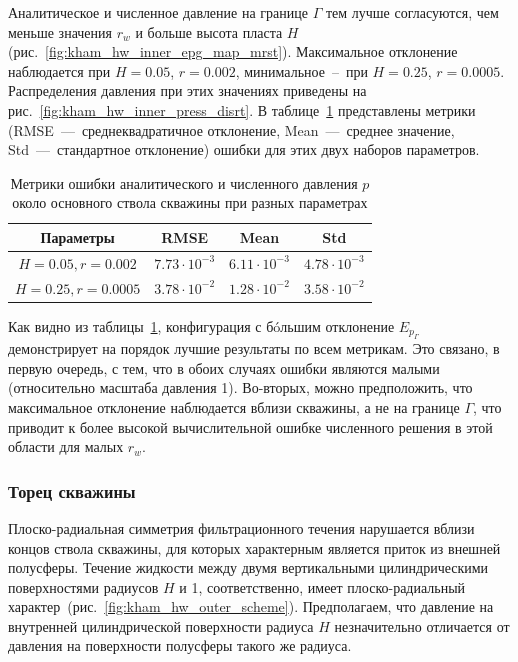 \documentclass{article}
\begin{document}
Аналитическое и численное давление на границе $\Gamma$ тем лучше согласуются, чем меньше
значения $r_w$ и больше высота пласта $H$ (рис.~\ref{fig:kham_hw_inner_epg_map_mrst}).
Максимальное отклонение наблюдается при $H = 0.05$, $r = 0.002$,
минимальное~--~при $H = 0.25$, $r = 0.0005$. Распределения давления при
этих значениях приведены на рис.~\ref{fig:kham_hw_inner_press_disrt}.
В таблице~\ref{tab:kham_hw_inner_p_error_metrics} представлены метрики~\cite{lit:kham_kolmogorov1974}
(RMSE~---~среднеквадратичное отклонение, Mean~---~среднее значение, Std~---~стандартное отклонение) ошибки
для этих двух наборов параметров.

\begin{table}[H]
	\centering
	\caption{
		Метрики ошибки аналитического и численного давления $p$ около основного ствола скважины
		при разных параметрах
	}
	\label{tab:kham_hw_inner_p_error_metrics}
	\begin{tabular}{|c|c|c|c|} %
		\hline %
		\textbf{Параметры} & \textbf{RMSE}        & \textbf{Mean}        & \textbf{Std}         \\
		\hline %
		$H=0.05, r=0.002$  & $7.73 \cdot 10^{-3}$ & $6.11 \cdot 10^{-3}$ & $4.78 \cdot 10^{-3}$ \\
		\hline %
		$H=0.25, r=0.0005$ & $3.78 \cdot 10^{-2}$ & $1.28 \cdot 10^{-2}$ & $3.58 \cdot 10^{-2}$ \\
		\hline %
	\end{tabular}
\end{table}

Как видно из таблицы~\ref{tab:kham_hw_inner_p_error_metrics}, конфигурация
с б\'{o}льшим отклонение $E_{p_{\Gamma}}$ демонстрирует на порядок лучшие результаты по всем
метрикам. Это связано, в первую очередь, с тем, что в обоих случаях ошибки являются
малыми (относительно масштаба давления 1). Во-вторых, можно предположить, что максимальное
отклонение наблюдается вблизи скважины, а не на границе $\Gamma$, что приводит к более высокой
вычислительной ошибке численного решения в этой области для малых $r_w$.

\subsubsection{Торец скважины}

Плоско-радиальная симметрия фильтрационного течения нарушается вблизи концов
ствола скважины, для которых характерным является приток из внешней полусферы.
Течение жидкости между двумя вертикальными цилиндрическими поверхностями
радиусов $H$ и 1, соответственно, имеет плоско-радиальный характер~(рис.~\ref{fig:kham_hw_outer_scheme}).
Предполагаем, что давление на внутренней цилиндрической поверхности радиуса $H$ незначительно
отличается от давления на поверхности полусферы такого же радиуса.
\end{document}
